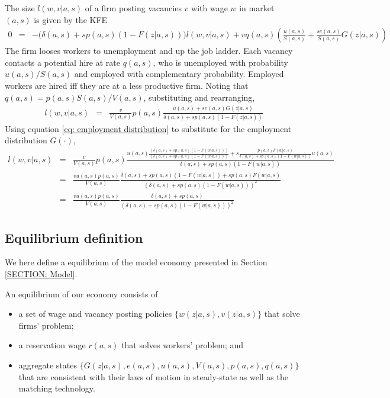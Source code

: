 The size $l(w,v|a,s)$ of a firm posting vacancies $v$ with wage $w$ in market $(a,s)$ is given by the KFE
\begin{eqnarray*}
0 &=& - \Big(\delta(a,s)+sp(a,s)(1-F(z|a,s))\Big) l(w,v|a,s) + vq(a,s)\left( \frac{u(a,s)}{S(a,s)} + \frac{se(a,s)}{S(a,s)}G(z|a,s)\right)
\end{eqnarray*}
The firm looses workers to unemployment and up the job ladder. Each vacancy contacts a potential hire at rate $q(a,s)$, who is unemployed with probability $u(a,s)/S(a,s)$ and employed with complementary probability. Employed workers are hired iff they are at a less productive firm. Noting that $q(a,s)=p(a,s)S(a,s)/V(a,s)$, substituting and rearranging,
\begin{eqnarray*}
l(w,v|a,s) &=& \frac{v}{V(a,s)} p(a,s) \frac{u(a,s) + se(a,s)G(z|a,s)}{\delta(a,s)+sp(a,s)(1-F(z|a,s)) }
\end{eqnarray*}
Using equation \eqref{eq: employment distribution} to substitute for the employment distribution $G(\cdot)$,
\begin{eqnarray*}
l(w,v|a,s) &=& \frac{v}{V(a,s)} p(a,s) \frac{u(a,s)\frac{\left(\delta(a,s) + sp(a,s) \left(1-F\left(w|a,s\right)\right)\right)}{\left(\delta(a,s) + sp(a,s) \left(1-F\left(w|a,s\right)\right)\right)} +s \frac{p(a,s)F\left(w|a,s\right)}{\delta(a,s) + sp(a,s) \left(1-F\left(w|a,s\right)\right)}u(a,s)}{\delta(a,s)+sp(a,s)(1-F(w|a,s))} \\
&=& \frac{v u(a,s) p(a,s) }{V(a,s)} \frac{\delta(a,s) + sp(a,s) \left(1-F\left(w|a,s\right)\right) +s p(a,s)F\left(w|a,s\right)}{\left(\delta(a,s)+sp(a,s)(1-F(w|a,s))\right)^2} \\
&=& \frac{v u(a,s) p(a,s) }{V(a,s)} \frac{\delta(a,s) + sp(a,s)}{\left(\delta(a,s)+sp(a,s)(1-F(w|a,s))\right)^2}
\end{eqnarray*}




\clearpage
\subsection{Equilibrium definition\label{app_subsec:equilibrium_definition}}

We here define a equilibrium of the model economy presented in Section \ref{SECTION: Model}.

\begin{definition}
An equilibrium of our economy consists of
\begin{itemize}
  \item a set of wage and vacancy posting policies $\Big\{w(z|a,s),v(z|a,s)\Big\}$ that solve firms' problem;
  \item a reservation wage $r(a,s)$ that solves workers' problem; and
  \item aggregate states $\Big\{ G(z|a,s),e(a,s),u(a,s),V(a,s),p(a,s),q(a,s)\Big\}$ that are consistent with their laws of motion in steady-state as well as the matching technology.
\end{itemize}
\end{definition}

